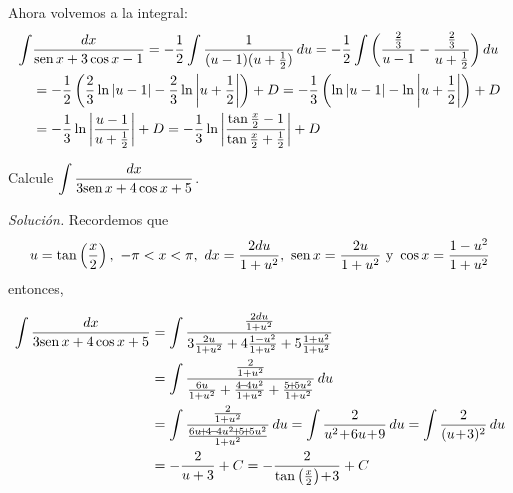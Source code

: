 Ahora volvemos a la integral:
{\footnotesize
\begin{align*}
\int &\frac{dx}{\text{\rm sen}\, x+3\cos x-1}=-\frac{1}{2}\int \frac{1}{(u-1)(u+\frac{1}{2})}\, du
=-\frac{1}{2}\int \left(\frac{\frac{2}{3}}{u-1}-\frac{\frac{2}{3}}{u+\frac{1}{2}}\right )du \\
&=-\frac{1}{2}\left(\frac{2}{3}\ln |u-1|-\frac{2}{3}\ln \left|u+\frac{1}{2}\right|\right)+D =-\frac{1}{3}\left(\ln |u-1|-\ln \left|u+\frac{1}{2}\right|\right)+D\\
&=-\frac{1}{3}\ln \left|\frac{u-1}{u+\frac{1}{2}}\right|+D=-\frac{1}{3}\ln \left|\frac{\tan \frac{x}{2}-1}{\tan \frac{x}{2}+\frac{1}{2}}\right|+D
\end{align*}
}

\begin{ejemplo}
Calcule $\displaystyle{\int \frac{dx}{3\text{\rm sen}\,x+4\cos x+5}}$.
\end{ejemplo}
\textit{Solución.} Recordemos que
{\small
\[
u=\tan \left( \frac{x}{2}\right),\ -\pi<x<\pi,\ dx=\frac{2du}{1+u^{2}},\ \sen x=\frac{2u}{1+u^{2}}\text{ y }\cos x=\frac{1-u^{2}}{1+u^{2}}
\]
}
entonces,

{\footnotesize
\begin{align*}
\int \frac{dx}{3\sen x+4\cos x+5}
&= \int \frac{\frac{2du}{1+u^{2}}}{3\frac{2u}{1+u^{2}} + 4\frac{1-u^{2}}{1+u^{2}} + 5\frac{1+u^{2}}{1+u^{2}}} \\
&= \int \frac{\frac{2}{1+u^{2}}}{\frac{6u}{1+u^{2}} + \frac{4\!-\!4u^{2}}{1+u^{2}} + \frac{5\!+\!5u^{2}}{1+u^{2}}} \, du \\
&= \int \frac{\frac{2}{1+u^{2}}}{\frac{6u\!+\!4\!-\!4u^{2}\!+\!5\!+\!5u^{2}}{1+u^{2}}} \, du
= \int \frac{2}{u^{2}\!+\!6u\!+\!9} \, du
= \int \frac{2}{(u\!+\!3)^{2}} \, du \\
&= -\frac{2}{u+3} + C
= -\frac{2}{\tan\left(\frac{x}{2}\right)\!+\!3} + C
\end{align*}
}

